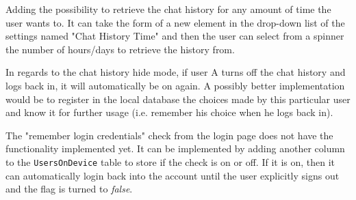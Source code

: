 Adding the possibility to retrieve the chat history for any amount of time the user wants to. It can take the form of a new element in the drop-down list of the settings named "Chat History Time" and then the user can select from a spinner the number of hours/days to retrieve the history from.

In regards to the chat history hide mode, if user A turns off the chat history and logs back in, it will automatically be on again. A possibly better implementation would be to register in the local database the choices made by this particular user and know it for further usage (i.e. remember his choice when he logs back in).

The "remember login credentials" check from the login page does not have the functionality implemented yet. It can be implemented by adding another column to the \verb|UsersOnDevice| table to store if the check is on or off. If it is on, then it can automatically login back into the account until the user explicitly signs out and the flag is turned to {\it{false}}.
